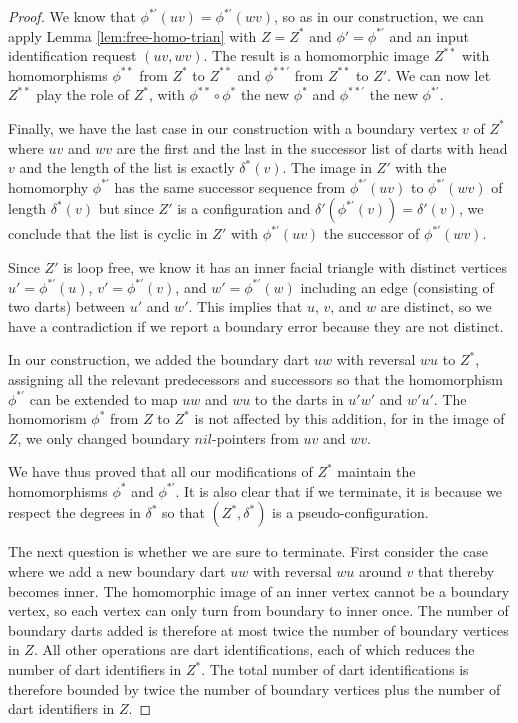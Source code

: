 \documentclass[10pt,a4paper]{article}
\def\nil{\textit{nil}}
\begin{document}
\begin{proof}
We know that $\phi^{*\prime}(uv)=\phi^{*\prime}(wv)$, so as in our construction, we can apply Lemma \ref{lem:free-homo-trian} with $Z=Z^*$ and $\phi'=\phi^{*\prime}$ and an input identification request $(uv,wv)$.
The result is a homomorphic image $Z^{**}$ with homomorphisms $\phi^{**}$ from $Z^*$ to $Z^{**}$ and $\phi^{**'}$ from
$Z^{**}$ to $Z'$. We can now let
$Z^{**}$ play the role of $Z^*$,
with $\phi^{**}\circ \phi^*$ the new $\phi^*$ and $\phi^{**\prime}$ the new $\phi^{*\prime}$.

Finally, we have the last case in our construction with a boundary vertex  $v$ of $Z^*$
where $uv$ and $wv$ are the first and the last in the successor list of darts with head $v$ and the length of the list is exactly $\delta^*(v)$. The image in $Z'$ with the homomorphy $\phi^{*\prime}$ has the same successor sequence
from $\phi^{*\prime}(uv)$ to $\phi^{*\prime}(wv)$ of length $\delta^*(v)$ but since $Z'$ is a configuration and $\delta'(\phi^{*\prime}(v))=\delta'(v)$, we conclude that the list is cyclic in $Z'$ with $\phi^{*\prime}(uv)$ the successor of $\phi^{*\prime}(wv)$.

Since $Z'$ is loop free, we know it has an inner
facial triangle with 
distinct vertices $u'=\phi^{*\prime}(u)$, $v'=\phi^{*\prime}(v)$, and $w'=\phi^{*\prime}(w)$ including an
edge (consisting of two darts) between $u'$ and $w'$. 
This implies that $u$, $v$, and $w$ are distinct,
so we have a contradiction if we report a boundary error because they are not distinct.

In our construction, we  added the boundary dart  $uw$ with reversal $wu$ to $Z^*$, assigning all the relevant predecessors and successors so that the homomorphism $\phi^{*\prime}$ can be extended to map $uw$ and
$wu$ to the darts in $u'w'$ and $w'u'$. The homomorism $\phi^*$ from
$Z$ to $Z^*$ is not affected by this addition,
for in the image of $Z$,
we only changed boundary  $\nil$-pointers from $uv$
and $wv$.

We have thus proved that all our modifications
of $Z^*$ maintain the homomorphisms $\phi^*$ and $\phi^{*\prime}$. It is also clear that if we terminate, it is because we respect the degrees in $\delta^*$ so that
$(Z^*,\delta^*)$ is a pseudo-configuration.


The next question is whether we are sure to terminate. First consider the case where we add a new boundary dart $uw$ with reversal $wu$ around $v$ that thereby becomes inner.
The homomorphic image of an inner vertex cannot be a boundary vertex, so each vertex can only turn from boundary to inner once. The number of boundary darts added is therefore at most twice the number of boundary vertices in $Z$.  All other operations are dart identifications, each of which reduces the number of dart identifiers in $Z^*$. The total number of dart identifications 
is therefore bounded by  twice the number of boundary vertices plus 
the number of dart identifiers in $Z$.


\end{proof}
\end{document}
